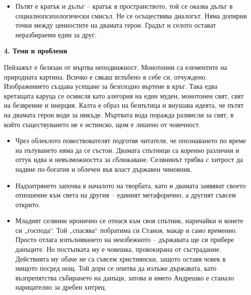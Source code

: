 \documentclass[12pt,a4paper]{article}
\begin{document}
\begin{itemize}[leftmargin=*]
\vspace{-0.45cm}
\item Пътят е кратък и дълъг – кратък в пространството, той се оказва дълъг в социалнопсихологически смисъл. Не се осъществява диалогът. Няма допирни точки между ценностите на двамата герои. Градът и селото остават неразбираеми един за друг.
\end{itemize}

\vspace{0.1cm}
 
\textbf{4. Теми и проблеми}
\vspace{0.1cm}

\indent Пейзажът е белязан от мъртва неподвижност. Монотонни са елементите на природната картина. Всичко е сякаш вглъбено в себе си, отчуждено. Изображението създава усещане за безплодно въртене в кръг. Така едва кретащата каруца се осмисля като алегория на един муден, монотонен свят, свят на безвремие и инерция. Калта е образ на безпътица и внушава идеята, че пътят на двамата герои води за никъде. Мъртвата вода поражда размисли за свят, в който съществуването не е истинско, щом е лишено от човечност.

\begin{itemize}[leftmargin=*]
\vspace{-0.20cm}
\item Чрез облеклото повествователят подготвя читателя, че опознаването по време на пътуването няма да се състои. Двамата спътници са коренно различни и оттук идва и невъзможността за сближаване. Селянинът трябва с хитрост да надвие по-богатия и облечен във власт държавен чиновник.
\end{itemize}

\begin{itemize}[leftmargin=*]
\vspace{-0.45cm}
\item Надхитрянето започва в началото на творбата, като и двамата заявяват своето отношение към света на другия – единият метафорично, а другият съвсем открито.
\end{itemize}

\begin{itemize}[leftmargin=*]
\vspace{-0.45cm}
\item Младият селянин иронично се отнася към своя спътник, наричайки и конете си „господа“. Той „спасява“ побратима си Станоя, макар и само временно. Просто отлага изпълняването на неизбежното – държавата ще си прибере данъците. Но постъпката му е човешка, провокирана от състрадание. Действията му обаче не са съвсем християнски, защото оставя човек в нищото посред нощ. Той дори се опитва да излъже държавата, като възпрепятства събирането на данъци, затова и името Андрешко е станало нарицателно за дребен хитрец.
\end{itemize}
\end{document}
